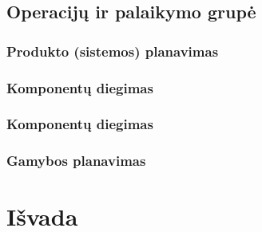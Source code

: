 \documentclass{VUMIFPSkursinis}
\begin{document}
\subsection{Operacijų ir palaikymo grupė}
\subsubsection{Produkto (sistemos) planavimas}
\subsubsection{Komponentų diegimas}
\subsubsection{Komponentų diegimas}
\subsubsection{Gamybos planavimas}

\section{Išvada}
\end{document}
